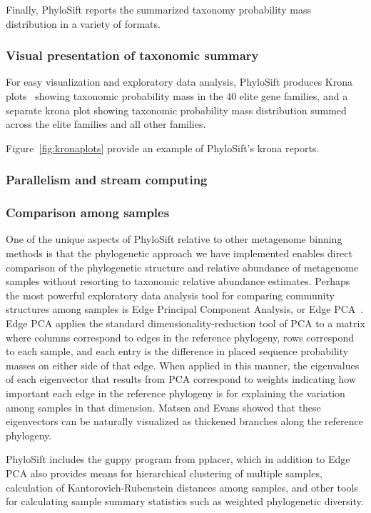 \documentclass[10pt]{article}
\begin{document}
Finally, PhyloSift reports the summarized taxonomy probability mass distribution in a variety of formats.

\subsubsection*{Visual presentation of taxonomic summary}

For easy visualization and exploratory data analysis, PhyloSift produces Krona plots~\cite{Ondov2011} showing taxonomic probability mass in the 40 elite gene families, and a separate krona plot showing taxonomic probability mass distribution summed across the elite families and all other families.

Figure~\ref{fig:kronaplots} provide an example of PhyloSift's krona reports.

\subsubsection*{Parallelism and stream computing}

\subsubsection*{Comparison among samples}

One of the unique aspects of PhyloSift relative to other metagenome binning methods is that the phylogenetic approach we have implemented enables direct comparison of the phylogenetic structure and relative abundance of metagenome samples without resorting to taxonomic relative abundance estimates.
Perhaps the most powerful exploratory data analysis tool for comparing community structures among samples is Edge Principal Component Analysis, or Edge PCA~\cite{Matsen2012}.
Edge PCA applies the standard dimensionality-reduction tool of PCA to a matrix where columns correspond to edges in the reference phylogeny, rows correspond to each sample, and each entry is the difference in placed sequence probability masses on either side of that edge.
When applied in this manner, the eigenvalues of each eigenvector that results from PCA correspond to weights indicating how important each edge in the reference phylogeny is for explaining the variation among samples in that dimension.
Matsen and Evans showed that these eigenvectors can be naturally visualized as thickened branches along the reference phylogeny.

PhyloSift includes the guppy program from pplacer, which in addition to Edge PCA also provides means for hierarchical clustering of multiple samples, calculation of Kantorovich-Rubenstein distances among samples, and other tools for calculating sample summary statistics such as weighted phylogenetic diversity.
\end{document}

